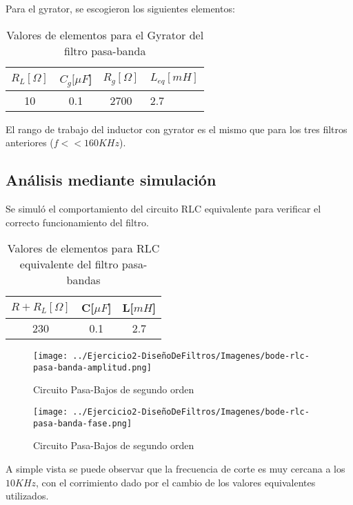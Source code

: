 Para el gyrator, se escogieron los siguientes elementos:

\begin{table}[H]
    \centering
    \begin{tabular}{|c|c|c|l|}
    \hline
    \rowcolor[HTML]{C0C0C0} 
    $R_L[\Omega]$ & $C_g[\mu F$] & $R_g[\Omega]$  & $L_{eq}[mH]$ \\ \hline
    10      & 0.1  & 2700 & 2.7        \\ \hline
    \end{tabular}
    \caption{Valores de elementos para el Gyrator del filtro pasa-banda}
    \end{table}

El rango de trabajo del inductor con gyrator es el mismo que para los tres filtros anteriores ($ f << 160 KHz$).

\subsection{Análisis mediante simulación}

Se simuló el comportamiento del circuito RLC equivalente para verificar el correcto funcionamiento del filtro.

\begin{table}[H]
    \centering
    \begin{tabular}{|c|c|c|}
    \hline
    \rowcolor[HTML]{C0C0C0} 
    $R+R_L[\Omega]$ & C[$\mu F$] & L[$mH$]  \\ \hline
    230     & 0.1  & 2.7 \\ \hline
    \end{tabular}
    \caption{Valores de elementos para RLC equivalente del filtro pasa-bandas}
    \end{table}


\begin{figure}[H]
    \centering
    \texttt{[image: ../Ejercicio2-DiseñoDeFiltros/Imagenes/bode-rlc-pasa-banda-amplitud.png]}
    \caption{Circuito Pasa-Bajos de segundo orden}
\end{figure}

\begin{figure}[H]
    \centering
    \texttt{[image: ../Ejercicio2-DiseñoDeFiltros/Imagenes/bode-rlc-pasa-banda-fase.png]}
    \caption{Circuito Pasa-Bajos de segundo orden}
\end{figure}

A simple vista se puede observar que la frecuencia de corte es muy cercana a los $10 KHz$, con el corrimiento dado por
el cambio de los valores equivalentes utilizados.

